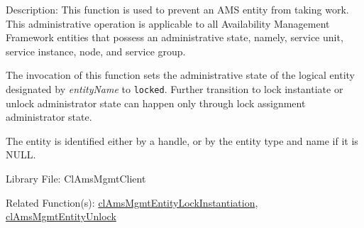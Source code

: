 \begin{Desc}
\item[Description:]This function is used to prevent an AMS entity from taking work. This administrative operation is applicable to all Availability Management Framework entities that possess an administrative state, namely, service unit, service instance, node, and service group. \par
 \par
 The invocation of this function sets the administrative state of the logical entity designated by {\em entity\-Name\/} to {\tt locked}. Further transition to lock instantiate or unlock administrator state can happen only through lock assignment administrator state.\par
 \par
 The entity is identified either by a handle, or by the entity type and name if it is NULL.\end{Desc}
\begin{Desc}
\item[Library File:]Cl\-Ams\-Mgmt\-Client\end{Desc}
\begin{Desc}
\item[Related Function(s):]\hyperlink{pageams111}{cl\-Ams\-Mgmt\-Entity\-Lock\-Instantiation}, 
\hyperlink{pageams112}{cl\-Ams\-Mgmt\-Entity\-Unlock} \end{Desc}

\newpage
